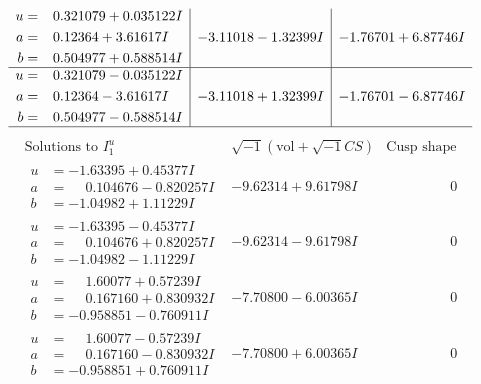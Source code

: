 \documentclass[1p]{elsarticle_modified}
\theoremstyle{definition}
\newcommand{\I}{\sqrt{-1}}
\begin{document}
$$\begin{array}{c|c|c}
\begin{aligned}
u &= \phantom{-}0.321079 + 0.035122 I \\
a &= \phantom{-}0.12364 + 3.61617 I \\
b &= \phantom{-}0.504977 + 0.588514 I\end{aligned}
 & -3.11018 - 1.32399 I & -1.76701 + 6.87746 I \\ \hline\begin{aligned}
u &= \phantom{-}0.321079 - 0.035122 I \\
a &= \phantom{-}0.12364 - 3.61617 I \\
b &= \phantom{-}0.504977 - 0.588514 I\end{aligned}
 & -3.11018 + 1.32399 I & -1.76701 - 6.87746 I\\
 \hline 
 \end{array}$$\newpage$$\begin{array}{c|c|c}  
\text{Solutions to }I^u_{1}& \I (\text{vol} + \sqrt{-1}CS) & \text{Cusp shape}\\
 \hline 
\begin{aligned}
u &= -1.63395 + 0.45377 I \\
a &= \phantom{-}0.104676 - 0.820257 I \\
b &= -1.04982 + 1.11229 I\end{aligned}
 & -9.62314 + 9.61798 I & \phantom{-0.000000 } 0 \\ \hline\begin{aligned}
u &= -1.63395 - 0.45377 I \\
a &= \phantom{-}0.104676 + 0.820257 I \\
b &= -1.04982 - 1.11229 I\end{aligned}
 & -9.62314 - 9.61798 I & \phantom{-0.000000 } 0 \\ \hline\begin{aligned}
u &= \phantom{-}1.60077 + 0.57239 I \\
a &= \phantom{-}0.167160 + 0.830932 I \\
b &= -0.958851 - 0.760911 I\end{aligned}
 & -7.70800 - 6.00365 I & \phantom{-0.000000 } 0 \\ \hline\begin{aligned}
u &= \phantom{-}1.60077 - 0.57239 I \\
a &= \phantom{-}0.167160 - 0.830932 I \\
b &= -0.958851 + 0.760911 I\end{aligned}
 & -7.70800 + 6.00365 I & \phantom{-0.000000 } 0 \\ \hline\begin{aligned}

\end{aligned}
\end{array}$$
\end{document}
